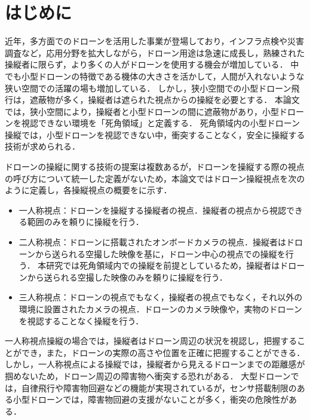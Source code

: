 \documentclass[submit, sigrecommended]{ipsj}
\begin{document}
\section{はじめに}
\label{sec:Introduction}
近年，多方面でのドローンを活用した事業が登場しており，インフラ点検や災害調査など，応用分野を拡大しながら，ドローン用途は急速に成長し，熟練された操縦者に限らず，より多くの人がドローンを使用する機会が増加している\cite{article-drone01}\cite{article-drone02}．
中でも小型ドローンの特徴である機体の大きさを活かして，人間が入れないような狭い空間での活躍の場も増加している\cite{article-drone04}\cite{article-drone05}．
しかし，狭小空間での小型ドローン飛行は，遮蔽物が多く，操縦者は遮られた視点からの操縦を必要とする\cite{article-drone03}．
本論文では，狭小空間により，操縦者と小型ドローンの間に遮蔽物があり，小型ドローンを視認できない環境を「死角領域」と定義する．
死角領域内の小型ドローン操縦では，小型ドローンを視認できない中，衝突することなく，安全に操縦する技術が求められる．
\par
ドローンの操縦に関する技術の提案は複数あるが\cite{article-drone07}\cite{article-ar01}\cite{book-drone05}，ドローンを操縦する際の視点の呼び方について統一した定義がないため，本論文ではドローン操縦視点を次のように定義し，各操縦視点の概要をに示す．
\begin{itemize}
  \item 一人称視点\mbox{}：ドローンを操縦する操縦者の視点．操縦者の視点から視認できる範囲のみを頼りに操縦を行う．
  \item 二人称視点\mbox{}：ドローンに搭載されたオンボードカメラの視点．操縦者はドローンから送られる空撮した映像を基に，ドローン中心の視点での操縦を行う．
  本研究では死角領域内での操縦を前提としているため，操縦者はドローンから送られる空撮した映像のみを頼りに操縦を行う．
  \item 三人称視点\mbox{}：ドローンの視点でもなく，操縦者の視点でもなく，それ以外の環境に設置されたカメラの視点．ドローンのカメラ映像や，実物のドローンを視認することなく操縦を行う．
\end{itemize}
\par
一人称視点操縦の場合では，操縦者はドローン周辺の状況を視認し，把握することができ，また，ドローンの実際の高さや位置を正確に把握することができる\cite{book-drone02}．
しかし，一人称視点による操縦では，操縦者から見えるドローンまでの距離感が掴めないため\cite{article-ar01}\cite{article-ar02}，ドローン周辺の障害物へ衝突する恐れがある．
大型ドローンでは，自律飛行や障害物回避などの機能が実現されているが，センサ搭載制限のある小型ドローンでは，障害物回避の支援がないことが多く，衝突の危険性がある．
\end{document}
